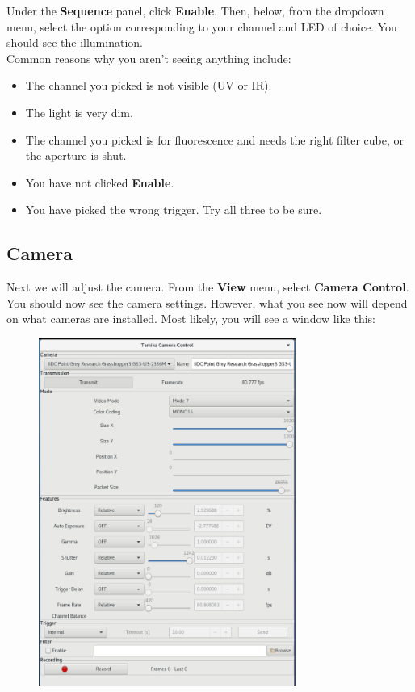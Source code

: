 \documentclass{article}
\begin{document}
Under the \textbf{Sequence} panel, click \textbf{Enable}. Then, below, from the dropdown menu, select the option corresponding to your channel and LED of choice. You should see the illumination.\\

Common reasons why you aren't seeing anything include:
\begin{itemize}
	\item The channel you picked is not visible (UV or IR).
	\item The light is very dim.
	\item The channel you picked is for fluorescence and needs the right filter cube, or the aperture is shut.
	\item You have not clicked \textbf{Enable}.
	\item You have picked the wrong trigger. Try all three to be sure.
\end{itemize}

\newpage

\subsection{Camera}

Next we will adjust the camera. From the \textbf{View} menu, select \textbf{Camera Control}.\\

You should now see the camera settings. However, what you see now will depend on what cameras are installed. Most likely, you will see a window like this:

\begin{figure}[h!]
\centering
\includegraphics[width=0.75\textwidth]{grasshopper}
\end{figure}
\end{document}
